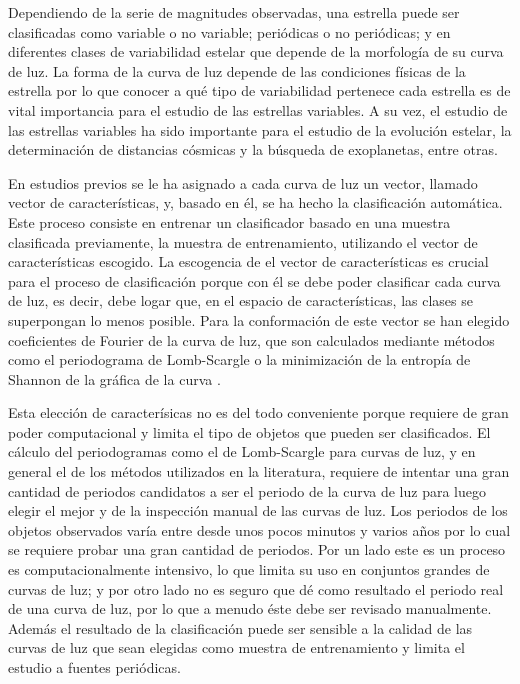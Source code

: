 \documentclass[letterpaper,12pt]{book}
\begin{document}
Dependiendo de la serie de magnitudes observadas, una estrella puede ser clasificadas como variable o no variable; periódicas o no periódicas; y en diferentes clases de variabilidad estelar que depende de la morfología de su curva de luz. La forma de la curva de luz depende de las condiciones físicas de la estrella por lo que conocer a qué tipo de variabilidad pertenece cada estrella es de vital importancia para el estudio de las estrellas variables. A su vez, el estudio de las estrellas variables ha sido importante para el estudio de la evolución estelar, la determinación de distancias cósmicas y la búsqueda de exoplanetas, entre otras. 

En estudios previos \cite{debosscher_automated_2007, sarro_automated_2009, richards_machine-learned_2011} se le ha asignado a cada curva de luz un vector, llamado vector de características, y, basado en él, se ha hecho la clasificación automática. Este proceso consiste en entrenar un clasificador basado en una muestra clasificada previamente, la  muestra de entrenamiento, utilizando el vector de características escogido. La escogencia de el vector de características es crucial para el proceso de clasificación porque con él se debe poder clasificar cada curva de luz, es decir, debe logar que, en el espacio de características, las clases se superpongan lo menos posible. Para la conformación de este vector se han elegido coeficientes de Fourier de la curva de luz\cite{debosscher_automated_2007, sarro_automated_2009, richards_machine-learned_2011}, que son calculados mediante métodos como el periodograma de  Lomb-Scargle \cite{scargle_studies_1982} o la minimización de la entropía de Shannon de la gráfica de la curva \cite{cincotta_astronomical_1995}. 

Esta elección de caracterísicas no es del todo conveniente porque requiere de gran poder computacional y limita el tipo de objetos que pueden ser clasificados. El cálculo del periodogramas como el de Lomb-Scargle para curvas de luz, y en general el de los métodos utilizados en la literatura, requiere de intentar una gran cantidad de periodos candidatos a ser el periodo de la curva de luz para luego elegir el mejor y de la inspección manual de las curvas de luz. Los periodos de los objetos observados varía entre desde unos pocos minutos y varios años por lo cual se requiere probar una gran cantidad de periodos. Por un lado este es un proceso es computacionalmente intensivo, lo que limita su uso en conjuntos grandes de curvas de luz; y por otro lado no es seguro que dé como resultado el periodo real de una curva de luz, por lo que a menudo éste debe ser revisado manualmente. Además el resultado de la clasificación puede ser sensible a la calidad de las curvas de luz que sean elegidas como muestra de entrenamiento \cite{debosscher_automated_2007} y limita el estudio a fuentes periódicas.  
\end{document}
